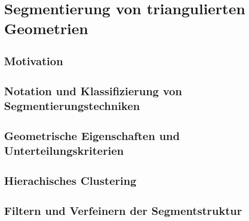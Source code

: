 \chapter{Segmentierung von triangulierten Geometrien}
\label{cha:segment}
	
\section{Motivation}


\section{Notation und Klassifizierung von Segmentierungstechniken}

\section{Geometrische Eigenschaften und Unterteilungskriterien}

\section{Hierachisches Clustering}


\section{Filtern und Verfeinern der Segmentstruktur}

